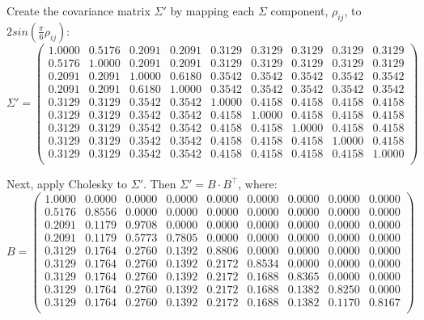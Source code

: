 \documentclass[a4paper,12pt,final]{article}
\begin{document}
Create the covariance matrix $\Sigma'$ by mapping each $\Sigma$ component, 
$\rho_{ij}$, to $2 sin(\frac{\pi}{6} \rho_{ij})$:
{\small
\begin{displaymath}
\Sigma' = 
\left( 
\begin{array}{ccccccccc}
   1.0000 & 0.5176 & 0.2091 & 0.2091 & 0.3129 & 0.3129 & 0.3129 & 0.3129 & 0.3129 \\
   0.5176 & 1.0000 & 0.2091 & 0.2091 & 0.3129 & 0.3129 & 0.3129 & 0.3129 & 0.3129 \\
   0.2091 & 0.2091 & 1.0000 & 0.6180 & 0.3542 & 0.3542 & 0.3542 & 0.3542 & 0.3542 \\
   0.2091 & 0.2091 & 0.6180 & 1.0000 & 0.3542 & 0.3542 & 0.3542 & 0.3542 & 0.3542 \\
   0.3129 & 0.3129 & 0.3542 & 0.3542 & 1.0000 & 0.4158 & 0.4158 & 0.4158 & 0.4158 \\
   0.3129 & 0.3129 & 0.3542 & 0.3542 & 0.4158 & 1.0000 & 0.4158 & 0.4158 & 0.4158 \\
   0.3129 & 0.3129 & 0.3542 & 0.3542 & 0.4158 & 0.4158 & 1.0000 & 0.4158 & 0.4158 \\
   0.3129 & 0.3129 & 0.3542 & 0.3542 & 0.4158 & 0.4158 & 0.4158 & 1.0000 & 0.4158 \\
   0.3129 & 0.3129 & 0.3542 & 0.3542 & 0.4158 & 0.4158 & 0.4158 & 0.4158 & 1.0000 \\
\end{array}
\right)
\end{displaymath}
}

Next, apply Cholesky to $\Sigma'$. Then $\Sigma' = B \cdot B^{\top}$, where:
{\small
\begin{displaymath}
B = 
\left(
\begin{array}{ccccccccc}
   1.0000 & 0.0000 & 0.0000 & 0.0000 & 0.0000 & 0.0000 & 0.0000 & 0.0000 & 0.0000 \\
   0.5176 & 0.8556 & 0.0000 & 0.0000 & 0.0000 & 0.0000 & 0.0000 & 0.0000 & 0.0000 \\
   0.2091 & 0.1179 & 0.9708 & 0.0000 & 0.0000 & 0.0000 & 0.0000 & 0.0000 & 0.0000 \\
   0.2091 & 0.1179 & 0.5773 & 0.7805 & 0.0000 & 0.0000 & 0.0000 & 0.0000 & 0.0000 \\
   0.3129 & 0.1764 & 0.2760 & 0.1392 & 0.8806 & 0.0000 & 0.0000 & 0.0000 & 0.0000 \\
   0.3129 & 0.1764 & 0.2760 & 0.1392 & 0.2172 & 0.8534 & 0.0000 & 0.0000 & 0.0000 \\
   0.3129 & 0.1764 & 0.2760 & 0.1392 & 0.2172 & 0.1688 & 0.8365 & 0.0000 & 0.0000 \\
   0.3129 & 0.1764 & 0.2760 & 0.1392 & 0.2172 & 0.1688 & 0.1382 & 0.8250 & 0.0000 \\
   0.3129 & 0.1764 & 0.2760 & 0.1392 & 0.2172 & 0.1688 & 0.1382 & 0.1170 & 0.8167 \\
\end{array}
\right)
\end{displaymath}
}
\end{document}
